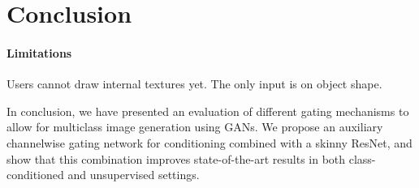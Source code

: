 

\section{Conclusion}

\paragraph{Limitations}
Users cannot draw internal textures yet. The only input is on object shape.

\noindent In conclusion, we have presented an evaluation of different gating mechanisms to allow for multiclass image generation using GANs. 
We propose an auxiliary channelwise gating network for conditioning combined with a skinny ResNet, and show that this combination improves state-of-the-art results in both class-conditioned and unsupervised settings.



